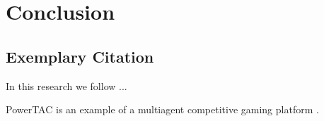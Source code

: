 \clearpage
\section{Conclusion}
\label{sec:Conclusion}

\subsection{Exemplary Citation}
\label{subsec:Section_Name_X/cite}


In this research we follow ...


PowerTAC is an example of a multiagent competitive gaming platform .